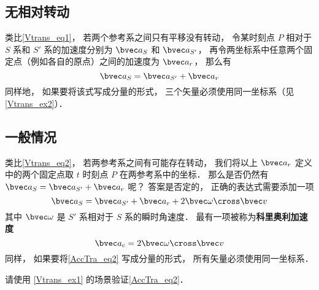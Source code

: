 

\subsection{无相对转动}
类比\autoref{Vtrans_eq1}， 若两个参考系之间只有平移没有转动， 令某时刻点 $P$ 相对于 $S$ 系和 $S'$ 系的加速度分别为 $\bvec a_S$ 和 $\bvec a_{S'}$， 再令两坐标系中任意两个固定点（例如各自的原点）之间的加速度为 $\bvec a_r$， 那么有
\begin{equation}\label{AccTra_eq1}
\bvec a_S = \bvec a_{S'} + \bvec a_r
\end{equation}
同样地， 如果要将该式写成分量的形式， 三个矢量必须使用同一坐标系（见\autoref{Vtrans_ex2}）．

\subsection{一般情况}
类比\autoref{Vtrans_eq2}， 若两参考系之间有可能存在转动， 我们将以上 $\bvec a_r$ 定义中的两个固定点取 $t$ 时刻点 $P$ 在两参考系中的坐标． 那么是否仍然有 $\bvec a_S = \bvec a_{S'} + \bvec a_r$ 呢？ 答案是否定的， 正确的表达式需要添加一项
\begin{equation}\label{AccTra_eq2}
\bvec a_S = \bvec a_{S'} + \bvec a_r + 2 \bvec \omega \cross \bvec v
\end{equation}
其中 $\bvec \omega$ 是 $S'$ 系相对于 $S$ 系的瞬时角速度． 最有一项被称为\textbf{科里奥利加速度}
\begin{equation}
\bvec a_c = 2 \bvec \omega \cross \bvec v
\end{equation}
同样， 如果要将\autoref{AccTra_eq2} 写成分量的形式， 所有矢量必须使用同一坐标系．

\begin{exercise}{}
请使用 \autoref{Vtrans_ex1} 的场景验证\autoref{AccTra_eq2}．
\end{exercise}

